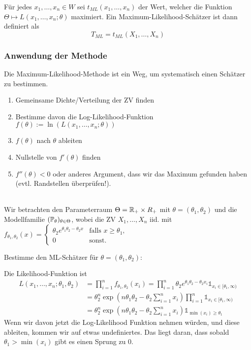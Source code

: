 \noindent Für jedes \(x_1, \ldots, x_n \in W\) sei \(t_{ML}(x_1, \ldots, x_n)\) der Wert, welcher die Funktion \(\Theta \mapsto L(x_1, \ldots, x_n; \theta)\) maximiert. Ein Maximum-Likelihood-Schätzer ist dann definiert als
\[T_{ML} = t_{ML}(X_1, \ldots, X_n)\]

\subsubsection{Anwendung der Methode}
Die Maximum-Likelihood-Methode ist ein Weg, um systematisch einen Schätzer zu bestimmen.
\begin{enumerate}
	\item Gemeinsame Dichte/Verteilung der ZV finden
	\item Bestimme davon die Log-Likelihood-Funktion\\ \(f(\theta) := \ln(L(x_1, \ldots, x_n;\theta))\)
	\item \(f(\theta)\) nach \(\theta\) ableiten
	\item Nullstelle von \(f'(\theta)\) finden
	\item $f''(\theta) < 0$ oder anderes Argument, dass wir das Maximum gefunden haben (evtl. Randstellen überprüfen!).
\end{enumerate}

\\
Wir betrachten den Parameterraum $\Theta = \R_+ \times R_+$ mit $\theta = (\theta_1, \theta_2)$ und die Modellfamilie $(\P_\theta)_{\theta\in \Theta}$, wobei die ZV $X_1, \ldots, X_n$ iid. mit $f_{\theta_1, \theta_2}(x) = \begin{cases}
    \theta_2e^{\theta_1\theta_2 - \theta_2x} & \text{falls }x \geq \theta_1,\\
    0 & \text{sonst.}
\end{cases}$

Bestimme den ML-Schätzer für $\theta = (\theta_1, \theta_2)$:

Die Likelihood-Funktion ist 
\begin{align*}
    L(x_1, \dots, x_n; \theta_1, \theta_2) &= \prod_{i = 1}^{n}f_{\theta_1, \theta_2}(x_i) = \prod_{i = 1}^n \theta_2e^{\theta_1\theta_2 - \theta_2 x_i} \mathds{1}_{x_i \in [\theta_1, \infty)}\\
    &= \theta_2^n \exp\left(n\theta_1\theta_2 - \theta_2 \sum_{i=1}^n x_i\right) \prod_{i=1}^n \mathds{1}_{x_i \in [\theta_1, \infty)}\\
    &= \theta_2^n \exp\left(n\theta_1\theta_2 - \theta_2 \sum_{i=1}^n x_i\right) \mathds{1}_{\min(x_i) \geq \theta_1}
\end{align*}
Wenn wir davon jetzt die Log-Likelihood Funktion nehmen würden, und diese ableiten, kommen wir auf etwas undefiniertes. 
Das liegt daran, dass sobald $\theta_1 > \min(x_i)$ gibt es einen Sprung zu $0$.

